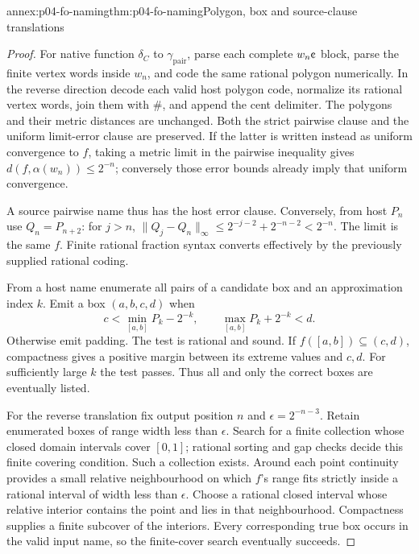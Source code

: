 \begin{annexitem}{annex:p04-fo-naming}{thm:p04-fo-naming}{Polygon, box and source-clause translations}
\begin{proof}
For native function \(\delta_C\) to
\(\gamma_{\mathrm{pair}}\), parse each complete
\(w_n\text{\textcent}\) block, parse the finite vertex words
inside \(w_n\), and code the same rational polygon numerically.
In the reverse direction decode each valid host polygon code,
normalize its rational vertex words, join them with \(\#\),
and append the cent delimiter. The polygons and their metric
distances are unchanged. Both the strict pairwise clause and
the uniform limit-error clause are preserved.
If the latter is written instead as uniform convergence to
\(f\), taking a metric limit in the pairwise inequality gives
\(d(f,\alpha(w_n))\leq2^{-n}\); conversely those error bounds
already imply that uniform convergence.

A source pairwise name thus has the host error clause.
Conversely, from host \(P_n\) use \(Q_n=P_{n+2}\):
for \(j>n\),
\(\lVert Q_j-Q_n\rVert_\infty
\leq2^{-j-2}+2^{-n-2}<2^{-n}\).
The limit is the same \(f\). Finite rational fraction syntax
converts effectively by the previously supplied rational coding.

From a host name enumerate all pairs of a candidate box and
an approximation index \(k\). Emit a box \((a,b,c,d)\) when
\[
 c<\min_{[a,b]}P_k-2^{-k},
 \qquad \max_{[a,b]}P_k+2^{-k}<d.
\]
Otherwise emit padding. The test is rational and sound.
If \(f([a,b])\subseteq(c,d)\), compactness gives a positive
margin between its extreme values and \(c,d\).
For sufficiently large \(k\) the test passes.
Thus all and only the correct boxes are eventually listed.

For the reverse translation fix output position \(n\) and
\(\epsilon=2^{-n-3}\). Retain enumerated boxes of range width
less than \(\epsilon\). Search for a finite collection whose
closed domain intervals cover \([0,1]\); rational sorting and
gap checks decide this finite covering condition.
Such a collection exists. Around each point continuity provides
a small relative neighbourhood on which \(f\)'s range fits
strictly inside a rational interval of width less than
\(\epsilon\). Choose a rational closed interval whose relative
interior contains the point and lies in that neighbourhood.
Compactness supplies a finite subcover of the interiors.
Every corresponding true box occurs in the valid input name,
so the finite-cover search eventually succeeds.


\end{proof}
\end{annexitem}
